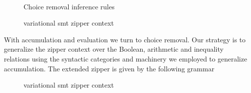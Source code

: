 ~\label{section:vsmt:choice-removal}
%
\begin{figure}
  
  \caption{Choice removal inference rules}%
  \label{fig:vsmt:inf:chc}
\end{figure}
% 
\begin{figure}
  \ContinuedFloat
  
  \caption{variational \ac{smt} zipper context}
  \label{fig:vsmt:zipper}
\end{figure}
%
With accumulation and evaluation we turn to choice removal. Our strategy is to
generalize the zipper context over the Boolean, arithmetic and inequality
relations using the syntactic categories and machinery we employed to generalize
accumulation. The extended zipper is given by the following grammar
% 
\begin{figure}
  
  \caption{variational \ac{smt} zipper context}
  \label{fig:vsmt:zipper}
\end{figure}

% 


